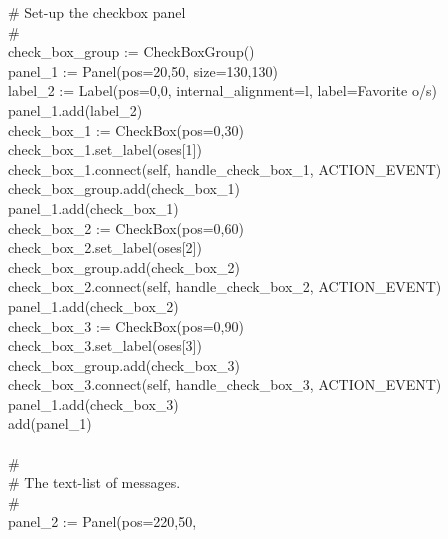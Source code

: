 {\>   \ \ \ \# Set-up the checkbox panel \\
\>   \ \ \ \# \\
\>   \ \ \ check\_box\_group := CheckBoxGroup() \\
\>   \ \ \ panel\_1 := Panel({\textquotedbl}pos=20,50{\textquotedbl},
{\textquotedbl}size=130,130{\textquotedbl}) \\
\>   \ \ \ label\_2 := Label({\textquotedbl}pos=0,0{\textquotedbl},
{\textquotedbl}internal\_alignment=l{\textquotedbl},
{\textquotedbl}label=Favorite o/s{\textquotedbl}) \\
\>   \ \ \ panel\_1.add(label\_2) \\
\>   \ \ \ check\_box\_1 :=
CheckBox({\textquotedbl}pos=0,30{\textquotedbl}) \\
\>   \ \ \ check\_box\_1.set\_label(oses[1]) \\
\>   \ \ \ check\_box\_1.connect(self,
{\textquotedbl}handle\_check\_box\_1{\textquotedbl}, ACTION\_EVENT) \\
\>   \ \ \ check\_box\_group.add(check\_box\_1) \\
\>   \ \ \ panel\_1.add(check\_box\_1) \\
\>   \ \ \ check\_box\_2 :=
CheckBox({\textquotedbl}pos=0,60{\textquotedbl}) \\
\>   \ \ \ check\_box\_2.set\_label(oses[2]) \\
\>   \ \ \ check\_box\_group.add(check\_box\_2) \\
\>   \ \ \ check\_box\_2.connect(self,
{\textquotedbl}handle\_check\_box\_2{\textquotedbl}, ACTION\_EVENT) \\
\>   \ \ \ panel\_1.add(check\_box\_2) \\
\>   \ \ \ check\_box\_3 :=
CheckBox({\textquotedbl}pos=0,90{\textquotedbl}) \\
\>   \ \ \ check\_box\_3.set\_label(oses[3]) \\
\>   \ \ \ check\_box\_group.add(check\_box\_3) \\
\>   \ \ \ check\_box\_3.connect(self,
{\textquotedbl}handle\_check\_box\_3{\textquotedbl}, ACTION\_EVENT) \\
\>   \ \ \ panel\_1.add(check\_box\_3) \\
\>   \ \ \ add(panel\_1) \\
\ \\
\>   \ \ \ \# \\
\>   \ \ \ \# The text-list of messages. \\
\>   \ \ \ \# \\
\>   \ \ \ panel\_2 := Panel({\textquotedbl}pos=220,50{\textquotedbl},
}
